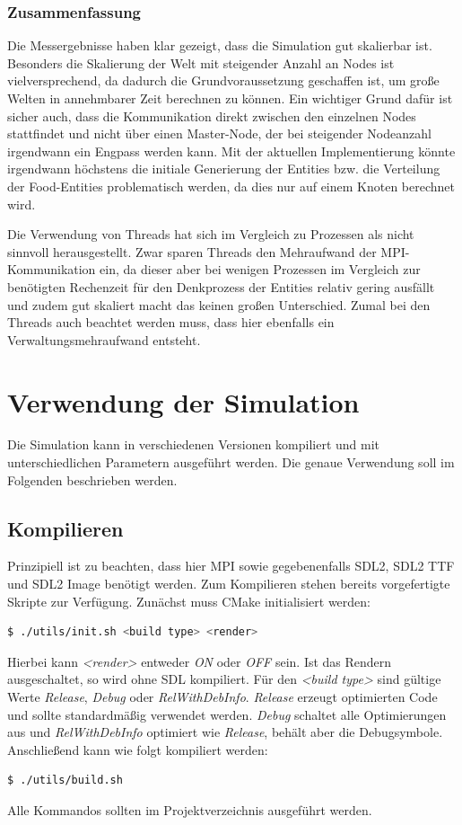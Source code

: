 \documentclass[course=erap]{aspdoc}
\begin{document}
\subsubsection{Zusammenfassung}
Die Messergebnisse haben klar gezeigt, dass die Simulation gut skalierbar ist. Besonders die Skalierung der Welt mit steigender Anzahl an Nodes ist vielversprechend, da dadurch die Grundvoraussetzung geschaffen ist, um große Welten in annehmbarer Zeit berechnen zu können. Ein wichtiger Grund dafür ist sicher auch, dass die Kommunikation direkt zwischen den einzelnen Nodes stattfindet und nicht über einen Master-Node, der bei steigender Nodeanzahl irgendwann ein Engpass werden kann. Mit der aktuellen Implementierung könnte irgendwann höchstens die initiale Generierung der Entities bzw. die Verteilung der Food-Entities problematisch werden, da dies nur auf einem Knoten berechnet wird.

Die Verwendung von Threads hat sich im Vergleich zu Prozessen als nicht sinnvoll herausgestellt. Zwar sparen Threads den Mehraufwand der MPI-Kommunikation ein, da dieser aber bei wenigen Prozessen im Vergleich zur benötigten Rechenzeit für den Denkprozess der Entities relativ gering ausfällt und zudem gut skaliert macht das keinen großen Unterschied. Zumal bei den Threads auch beachtet werden muss, dass hier ebenfalls ein Verwaltungsmehraufwand entsteht.

\section{Verwendung der Simulation}
Die Simulation kann in verschiedenen Versionen kompiliert und mit unterschiedlichen Parametern ausgeführt werden. Die genaue Verwendung soll im Folgenden beschrieben werden.
\subsection{Kompilieren}
Prinzipiell ist zu beachten, dass hier MPI sowie gegebenenfalls SDL2, SDL2 TTF und SDL2 Image benötigt werden.
Zum Kompilieren stehen bereits vorgefertigte Skripte zur Verfügung. Zunächst muss CMake initialisiert werden:
\begin{lstlisting}[language=bash]
  $ ./utils/init.sh <build type> <render>
\end{lstlisting}
Hierbei kann \emph{<render>} entweder \emph{ON} oder \emph{OFF} sein. Ist das Rendern ausgeschaltet, so wird ohne SDL kompiliert. Für den \emph{<build type>} sind gültige Werte \emph{Release}, \emph{Debug} oder \emph{RelWithDebInfo}. \emph{Release} erzeugt optimierten Code und sollte standardmäßig verwendet werden. \emph{Debug} schaltet alle Optimierungen aus und \emph{RelWithDebInfo} optimiert wie \emph{Release}, behält aber die Debugsymbole.
Anschließend kann wie folgt kompiliert werden:
\begin{lstlisting}[language=bash]
  $ ./utils/build.sh
\end{lstlisting}
Alle Kommandos sollten im Projektverzeichnis ausgeführt werden.
\end{document}

